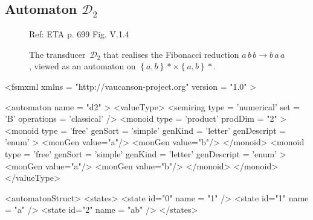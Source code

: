 \subsection{Automaton $\mathcal{D}_{2}$}
\label{automatonD2fmp}

\begin{figure}[h]
  \begin{minipage}[c]{.60\textwidth}
    Ref: ETA p. 699  Fig. V.1.4

    The transducer~$\mathcal{D}_{2}$ that realises the Fibonacci reduction 
    $a\, b\, b \rightarrow b\, a\, a$, viewed as an automaton on 
    $\left\{ a,b \right\}* \times \left\{ a,b \right\}*$.
  
  \end{minipage}
  \begin{minipage}[c]{.40\textwidth}


  \end{minipage}
\end{figure}

{\footnotesize 
\begin{listing}[5]{1} 
<fsmxml  xmlns   = "http://vaucanson-project.org" 
         version = "1.0" > 

<automaton name = "d2" >
  <valueType>
    <semiring  type       = 'numerical'
               set        = 'B'
               operations = 'classical' /> 
    <monoid    type       = 'product'
               prodDim    = "2" > 
      <monoid    type        = 'free'
                 genSort     = 'simple' 
                 genKind     = 'letter' 
                 genDescript = 'enum' > 
        <monGen value="a"/>
        <monGen value="b"/>
      </monoid>
      <monoid    type        = 'free'
                 genSort     = 'simple' 
                 genKind     = 'letter' 
                 genDescript = 'enum' > 
        <monGen value="a"/>
        <monGen value="b"/>
      </monoid>
    </monoid>
  </valueType>

  <automatonStruct>
    <states>
      <state  id="0"  name = "1" />
      <state  id="1"  name = "a" />
      <state  id="2"  name = "ab" />
    </states>
 
\end{listing}
}

